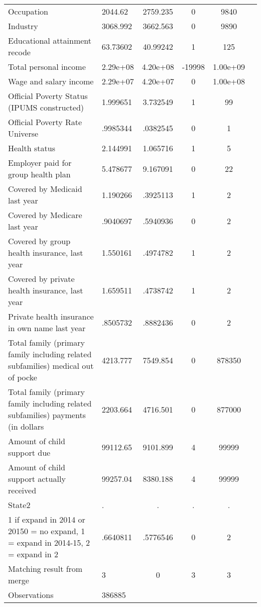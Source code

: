 \begin{table}[htbp]
\begin{tabular}{l*{1}{lcccc}}
Occupation          &     2044.62&    2759.235&           0&        9840\\
Industry            &    3068.992&    3662.563&           0&        9890\\
Educational attainment recode&    63.73602&    40.99242&           1&         125\\
Total personal income&    2.29e+08&    4.20e+08&      -19998&    1.00e+09\\
Wage and salary income&    2.29e+07&    4.20e+07&           0&    1.00e+08\\
Official Poverty Status (IPUMS constructed)&    1.999651&    3.732549&           1&          99\\
Official Poverty Rate Universe&    .9985344&    .0382545&           0&           1\\
Health status       &    2.144991&    1.065716&           1&           5\\
Employer paid for group health plan&    5.478677&    9.167091&           0&          22\\
Covered by Medicaid last year&    1.190266&    .3925113&           1&           2\\
Covered by Medicare last year&    .9040697&    .5940936&           0&           2\\
Covered by group health insurance, last year&    1.550161&    .4974782&           1&           2\\
Covered by private health insurance, last year&    1.659511&    .4738742&           1&           2\\
Private health insurance in own name last year&    .8505732&    .8882436&           0&           2\\
Total family (primary family including related subfamilies) medical out of pocke&    4213.777&    7549.854&           0&      878350\\
Total family (primary family including related subfamilies) payments (in dollars&    2203.664&    4716.501&           0&      877000\\
Amount of child support due&    99112.65&    9101.899&           4&       99999\\
Amount of child support actually received&    99257.04&    8380.188&           4&       99999\\
State2              &           .&           .&           .&           .\\
1 if expand in 2014 or 20150 = no expand, 1 = expand in 2014-15, 2 = expand in 2&    .6640811&    .5776546&           0&           2\\
Matching result from merge&           3&           0&           3&           3\\
\hline
Observations        &      386885&            &            &            \\
\hline\hline
\end{tabular}
\end{table}
